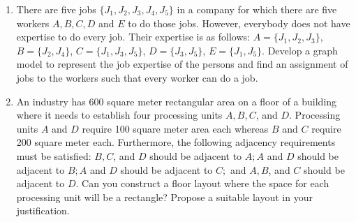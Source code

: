 \begin{enumerate}[leftmargin=1.5em]
{        
      }
      \item {
        There are five jobs $\{J_1, J_2, J_3, J_4, J_5\}$ in a company for which there are five workers $A, B, C, D$ and $E$ to do those jobs. However, everybody does not have expertise to do every job. Their expertise is as follows: $A = \{J_1, J_2, J_3\}$, $B = \{J_2, J_4\}$, $C = \{J_1, J_3, J_5\}$, $D = \{J_3, J_5\}$, $E = \{J_1, J_5\}$. Develop a graph model to represent the job expertise of the persons and find an assignment of jobs to the workers such that every worker can do a job.
        
      }
      \item {
        An industry has 600 square meter rectangular area on a floor of a building where it needs to establish four processing units $A, B, C$, and $D$. Processing units $A$ and $D$ require 100 square meter area each whereas $B$ and $C$ require 200 square meter each. Furthermore, the following adjacency requirements must be satisfied: $B, C$, and $D$ should be adjacent to $A; A$ and $D$ should be adjacent to $B; A$ and $D$ should be adjacent to $C;$ and $A, B$, and $C$ should be adjacent to $D$. Can you construct a floor layout where the space for each processing unit will be a rectangle? Propose a suitable layout in your justification.
        
}
\end{enumerate}
